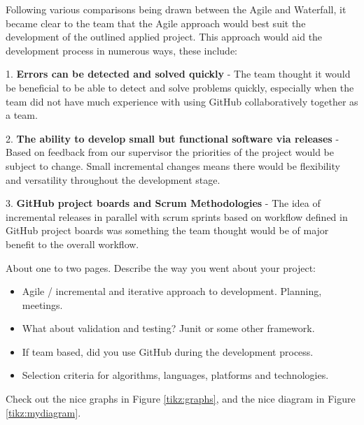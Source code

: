 Following various comparisons being drawn between the Agile and Waterfall, it became clear to the team that the Agile approach would best suit the development of the outlined applied project. This approach would aid the development process in numerous ways, these include:

\vspace{70mm} %

1. \textbf{Errors can be detected and solved quickly} - The team thought it would be beneficial to be able to detect and solve problems quickly, especially when the team did not have much experience with using GitHub collaboratively together as a team.

2. \textbf{The ability to develop small but functional software via releases} - Based on feedback from our supervisor the priorities of the project would be subject to change. Small incremental changes means there would be flexibility and versatility throughout the development stage.

3. \textbf{GitHub project boards and Scrum Methodologies} - The idea of incremental releases in parallel with scrum sprints based on workflow defined in GitHub project boards was something the team thought would be of major benefit to the overall workflow.





\vspace{70mm} %

About one to two pages.
Describe the way you went about your project:
\begin{itemize}
\item Agile / incremental and iterative approach to development. Planning, meetings.
\item What about validation and testing? Junit or some other framework.
\item If team based, did you use GitHub during the development process.
\item Selection criteria for algorithms, languages, platforms and technologies.
\end{itemize}
Check out the nice graphs in Figure \ref{tikz:graphs}, and the nice diagram in Figure \ref{tikz:mydiagram}.



